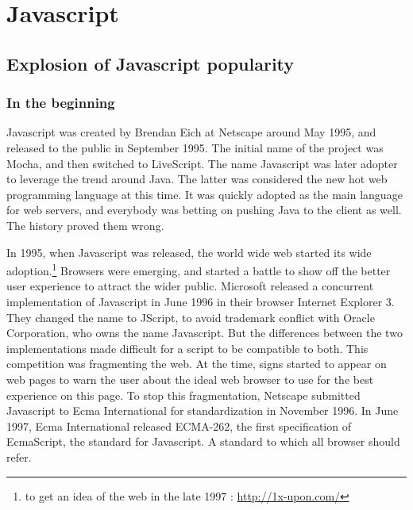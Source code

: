 \section{Javascript}

\subsection{Explosion of Javascript popularity}

\subsubsection{In the beginning}

Javascript was created by Brendan Eich at Netscape around May 1995, and released to the public in September 1995.
The initial name of the project was Mocha, and then switched to LiveScript.
The name Javascript was later adopter to leverage the trend around Java.
The latter was considered the new hot web programming language at this time.
It was quickly adopted as the main language for web servers, and everybody was betting on pushing Java to the client as well.
The history proved them wrong.

In 1995, when Javascript was released, the world wide web started its wide adoption.\footnote{to get an idea of the web in the late 1997 : \url{http://1x-upon.com/}}
Browsers were emerging, and started a battle to show off the better user experience to attract the wider public.
Microsoft released a concurrent implementation of Javascript in June 1996 in their browser Internet Explorer 3.
They changed the name to JScript, to avoid trademark conflict with Oracle Corporation, who owns the name Javascript.
But the differences between the two implementations made difficult for a script to be compatible to both.
This competition was fragmenting the web.
At the time, signs started to appear on web pages to warn the user about the ideal web browser to use for the best experience on this page.
To stop this fragmentation, Netscape submitted Javascript to Ecma International for standardization in November 1996.
In June 1997, Ecma International released ECMA-262, the first specification of EcmaScript, the standard for Javascript.
A standard to which all browser should refer.

